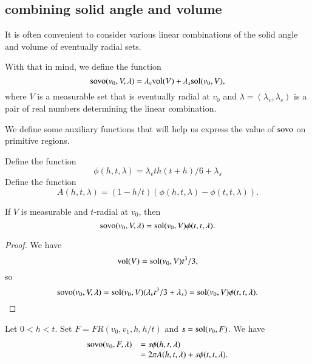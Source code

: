 \subsection{combining solid angle and volume}

It is often convenient to consider various linear combinations
of the solid angle and volume of eventually radial sets.  

\begin{definition}[sovo]\label{def:sovo}
With
that in mind, we define the function
  $$
  {\operatorname{sovo}}(v_0,V,\lambda) = \lambda_v {\operatorname{vol}}(V) + \lambda_s
  {\operatorname{sol}}(v_0,V),
  $$
where $V$ is a measurable set that is eventually radial at $v_0$
and $\lambda=(\lambda_v,\lambda_s)$ is a pair of real numbers
determining the linear combination.
\end{definition}

We define some auxiliary functions that will help us express
the value of ${\operatorname{sovo}}$ on primitive regions.

\begin{definition}[$\phi$, A]
Define the function
 $$
 \phi(h,t,\lambda)=
   \lambda_v  t h (t+h)/6 + \lambda_s 
 $$
Define the function
 $$A(h,t,\lambda) = (1-h/t) (\phi(h,t,\lambda) - \phi(t,t,\lambda)).$$
\end{definition}

\begin{lemma} If $V$ is measurable and $t$-radial at $v_0$,
then $${\operatorname{sovo}}(v_0,V,\lambda) = {\operatorname{sol}}(v_0,V)\phi(t,t,\lambda).$$
\end{lemma}

\begin{proof} We have $${\operatorname{vol}}(V) = {\operatorname{sol}}(v_0,V)t^3/3,$$
so $${\operatorname{sovo}}(v_0,V,\lambda) = 
  {\operatorname{sol}}(v_0,V)(\lambda_v t^3/3 + \lambda_s) = 
   {\operatorname{sol}}(v_0,V)\phi(t,t,\lambda).$$
\end{proof}

\begin{lemma} Let $0 < h < t$.
Set $F  = FR(v_0,v_1,h,h/t)$ and $s = \operatorname{sol}(v_0,F)$.
  We have
  $$
  \begin{array}{lll}
  {\operatorname{sovo}}(v_0,F,\lambda) 
   &= s
  \phi(h,t,\lambda) \\
   &= 2\pi A(h,t,\lambda) + s\phi(t,t,\lambda).
  \end{array}
  $$
\end{lemma}

